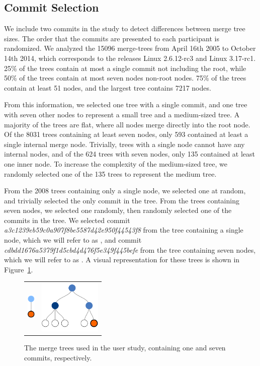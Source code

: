 \subsection{Commit Selection}
\label{sub:commit_selection}

We include two commits in the study to detect differences between merge
tree sizes. The order that the commits are presented to each participant
is randomized. We analyzed the 15096 merge-trees from April 16th 2005 to
October 14th 2014, which corresponds to the releases Linux 2.6.12-rc3
and Linux 3.17-rc1. 25\% of the trees contain at most a single commit
not including the root, while 50\% of the trees contain at most seven
nodes non-root nodes. 75\% of the trees contain at least 51 nodes, and
the largest tree contains 7217 nodes.

From this information, we selected one tree with a single commit, and
one tree with seven other nodes to represent a small tree and a
medium-sized tree. A majority of the trees are flat, where all nodes
merge directly into the root node. Of the 8031 trees containing at least
seven nodes, only 593 contained at least a single internal merge node.
Trivially, trees with a single node cannot have any internal nodes, and
of the 624 trees with seven nodes, only 135 contained at least one inner
node. To increase the complexity of the medium-sized tree, we randomly
selected one of the 135 trees to represent the medium tree.

From the 2008 trees containing only a single node, we selected one at
random, and trivially selected the only commit in the tree. From the
trees containing seven nodes, we selected one randomly, then randomly
selected one of the commits in the tree. We selected commit
\emph{a3c1239eb59c0a907f8be5587d42e950f44543f8} from the tree containing
a single node, which we will refer to as \comA, and commit
\emph{cdbdd1676a5379f1d5cbd4d476f5e349f445befe} from the tree containing
seven nodes, which we will refer to as \comB. A visual representation
for these trees is shown in Figure~\ref{fig:study_commits}.

\begin{figure}[bpt]
  \centering
  \begin{tabular}{ m{1.5cm} m{3cm} }
    \includegraphics[height=0.5in]{figures/commits/1-commit.pdf} &
    \includegraphics[height=1in]{figures/commits/7-commits.pdf}\\
  \end{tabular}
  \caption{The merge trees used in the user study,
    containing one and seven commits, respectively.}
  \label{fig:study_commits}
\end{figure}

